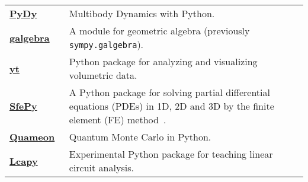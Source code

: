 \begin{longtable}[htbc]{>{\raggedright}p{0.2\linewidth}p{0.8\linewidth}}
\href{http://www.pydy.org/}{\textbf{PyDy}}~\cite{gede2013constrained} & Multibody Dynamics with
  Python. \\

\href{https://github.com/brombo/galgebra}{\textbf{galgebra}}~\cite{galgebra} &
  A module for geometric algebra (previously \texttt{sympy.galgebra}). \\

\href{http://yt-project.org/}{\textbf{yt}}~\cite{2011ApJS..192....9T} & Python package for
  analyzing and visualizing volumetric data. \\

\href{http://sfepy.org/}{\textbf{SfePy}}~\cite{cimrman2014sfepy} &
  A Python package for solving partial
  differential equations (PDEs) in 1D, 2D and 3D by the finite element (FE)
  method~\cite{Zienkiewicz2013FEM}. \\

\href{http://quameon.sourceforge.net/}{\textbf{Quameon}}~\cite{quameon} & Quantum
  Monte Carlo in Python. \\

\href{http://lcapy.elec.canterbury.ac.nz/}{\textbf{Lcapy}}~\cite{lcapy} &
  Experimental Python package for teaching linear circuit analysis. \\
\bottomrule
\end{longtable}
